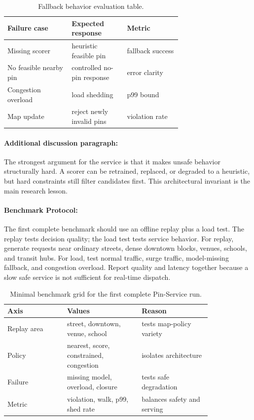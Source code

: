\documentclass{article}
\begin{document}
\begin{table}[t]
\centering
\caption{Fallback behavior evaluation table.}
\begin{tabular}{@{}p{0.26\linewidth}p{0.22\linewidth}p{0.22\linewidth}@{}}
\toprule
\textbf{Failure case} & \textbf{Expected response} & \textbf{Metric}\\
\midrule
Missing scorer & heuristic feasible pin & fallback success\\
No feasible nearby pin & controlled no-pin response & error clarity\\
Congestion overload & load shedding & p99 bound\\
Map update & reject newly invalid pins & violation rate\\
\bottomrule
\end{tabular}
\end{table}

\paragraph{Additional discussion paragraph:}

The strongest argument for the service is that it makes unsafe behavior structurally hard. A scorer can be retrained, replaced, or degraded to a heuristic, but hard constraints still filter candidates first. This architectural invariant is the main research lesson.

\paragraph{Benchmark Protocol:}

The first complete benchmark should use an offline replay plus a load test. The replay tests decision quality; the load test tests service behavior. For replay, generate requests near ordinary streets, dense downtown blocks, venues, schools, and transit hubs. For load, test normal traffic, surge traffic, model-missing fallback, and congestion overload. Report quality and latency together because a slow safe service is not sufficient for real-time dispatch.

\begin{table}[t]
\centering
\caption{Minimal benchmark grid for the first complete Pin-Service run.}
\begin{tabular}{@{}p{0.24\linewidth}p{0.30\linewidth}p{0.28\linewidth}@{}}
\toprule
\textbf{Axis} & \textbf{Values} & \textbf{Reason}\\
\midrule
Replay area & street, downtown, venue, school & tests map-policy variety\\
Policy & nearest, score, constrained, congestion & isolates architecture\\
Failure & missing model, overload, closure & tests safe degradation\\
Metric & violation, walk, p99, shed rate & balances safety and serving\\
\bottomrule
\end{tabular}
\end{table}
\end{document}

